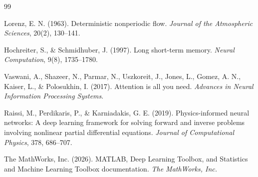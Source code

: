 \documentclass[UTF8,a4paper,12pt]{ctexart}
\begin{document}
\begin{thebibliography}{99}

Lorenz, E. N. (1963).
Deterministic nonperiodic flow.
\textit{Journal of the Atmospheric Sciences}, 20(2), 130--141.

Hochreiter, S., \& Schmidhuber, J. (1997).
Long short-term memory.
\textit{Neural Computation}, 9(8), 1735--1780.

Vaswani, A., Shazeer, N., Parmar, N., Uszkoreit, J., Jones, L., Gomez, A. N., Kaiser, L., \& Polosukhin, I. (2017).
Attention is all you need.
\textit{Advances in Neural Information Processing Systems}.

Raissi, M., Perdikaris, P., \& Karniadakis, G. E. (2019).
Physics-informed neural networks: A deep learning framework for solving forward and inverse problems involving nonlinear partial differential equations.
\textit{Journal of Computational Physics}, 378, 686--707.

The MathWorks, Inc. (2026).
MATLAB, Deep Learning Toolbox, and Statistics and Machine Learning Toolbox documentation.
\textit{The MathWorks, Inc.}

\end{thebibliography}
\end{document}
